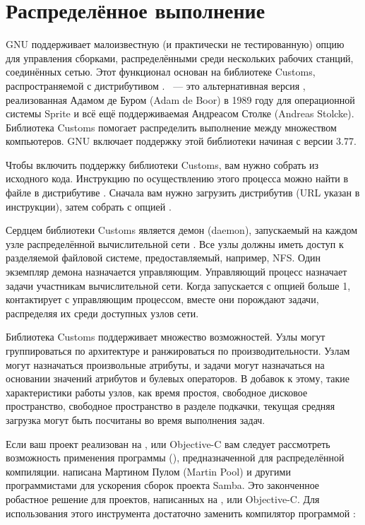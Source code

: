 \section{Распределённое выполнение \GNUmake{}}

GNU \GNUmake{} поддерживает малоизвестную (и практически не
тестированную) опцию для управления сборками, распределёнными среди
нескольких рабочих станций, соединённых сетью. Этот функционал основан
на библиотеке Customs, распространяемой с дистрибутивом
. ~--- это альтернативная версия
\GNUmake{}, реализованная Адамом де Буром (Adam de Boor) в 1989 году
для операционной системы Sprite и всё ещё поддерживаемая Андреасом
Столке (Andreas Stolcke). Библиотека Customs помогает распределить
выполнение \GNUmake{} между множеством компьютеров. GNU \GNUmake{}
включает поддержку этой библиотеки начиная с версии 3.77.

Чтобы включить поддержку библиотеки Customs, вам нужно собрать
\GNUmake{} из исходного кода. Инструкцию по осуществлению этого
процесса можно найти в файле  в дистрибутиве
\GNUmake{}. Сначала вам нужно загрузить дистрибутив 
(URL указан в инструкции), затем собрать \GNUmake{} с опцией
.

Сердцем библиотеки Customs является демон (daemon), запускаемый на
каждом узле распределённой вычислительной сети \GNUmake{}. Все узлы
должны иметь доступ к разделяемой файловой системе, предоставляемый,
например, NFS. Один экземпляр демона назначается управляющим.
Управляющий процесс назначает задачи участникам вычислительной сети.
Когда \GNUmake{} запускается с опцией  больше
1, \GNUmake{} контактирует с управляющим процессом, вместе они
порождают задачи, распределяя их среди доступных узлов сети.

Библиотека Customs поддерживает множество возможностей. Узлы могут
группироваться по архитектуре и ранжироваться по производительности.
Узлам могут назначаться произвольные атрибуты, и задачи могут
назначаться на основании значений атрибутов и булевых операторов. В
добавок к этому, такие характеристики работы узлов, как время
простоя, свободное дисковое пространство, свободное пространство в
разделе подкачки, текущая средняя загрузка могут быть посчитаны во
время выполнения задач.

Если ваш проект реализован на \Clang{}, \Cplusplus{} или Objective-C
вам следует рассмотреть возможность применения программы
 (),
предназначенной для распределённой компиляции. 
написана Мартином Пулом (Martin Pool) и другими программистами для
ускорения сборок проекта Samba. Это законченное робастное решение для
проектов, написанных на \Clang{}, \Cplusplus{} или Objective-C.
Для использования этого инструмента достаточно заменить компилятор
\Clang{} программой :

